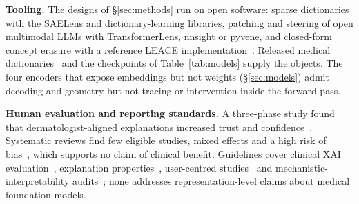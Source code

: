 \textbf{Tooling.} The designs of \S\ref{sec:methods} run on open software: sparse dictionaries with the
SAELens and dictionary-learning libraries, patching and steering of open multimodal LLMs with
TransformerLens, nnsight or pyvene, and closed-form concept erasure with a reference LEACE
implementation~\cite{belrose2023leace}. Released medical
dictionaries~\cite{abdulaal2024an,nooralahzadeh2026universal} and the checkpoints of
Table~\ref{tab:models} supply the objects. The four encoders that expose embeddings but not weights
(\S\ref{sec:models}) admit decoding and geometry but not tracing or intervention inside the forward pass.

\textbf{Human evaluation and reporting standards.} A three-phase study found that dermatologist-aligned
explanations increased trust and confidence~\cite{chanda2023dermatologist}. Systematic reviews find few
eligible studies, mixed effects and a high risk of bias~\cite{rosenbacke2024how,uddin2026which,gambetti2025a},
which supports no claim of clinical benefit. Guidelines cover clinical XAI
evaluation~\cite{jin2022guidelines,chen2021humancentered}, explanation
properties~\cite{nauta2023interpreting}, user-centred studies~\cite{rong2022userstudies,donosoguzman2025a}
and mechanistic-interpretability audits~\cite{lan2026auditable}; none addresses representation-level
claims about medical foundation models.
